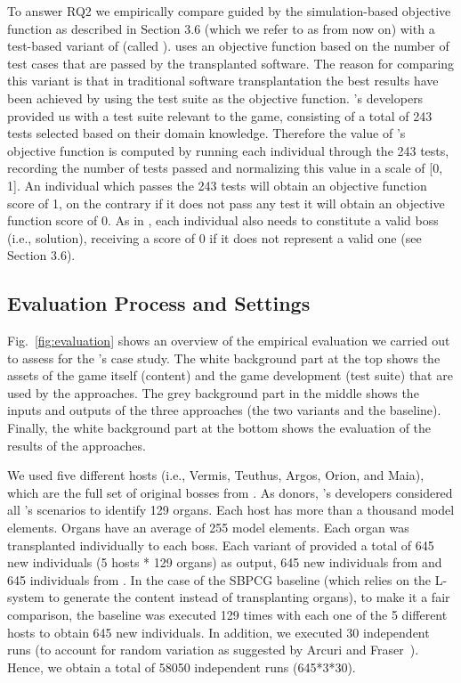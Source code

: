 To answer RQ2 we empirically compare \ApproachName guided by the simulation-based objective function as described in Section 3.6 (which we refer to as \simhotep{} from now on) with  a test-based variant of \ApproachName{} (called \timhotep{}). \timhotep{} uses an objective function based on the number of test cases that are passed by the transplanted software. 
The reason for comparing this variant is that in traditional software transplantation the best results have been achieved by using the test suite as the objective function. 
\CaseStudy{}'s developers provided us with a test suite relevant to the game, consisting of a total of 243 tests selected based on their domain knowledge. 
Therefore the value of \timhotep{}'s objective function is computed by running each individual through the 243 tests, recording the number of tests passed and normalizing this value in a scale of [0, 1]. An individual which passes the 243 tests will obtain an objective function score of 1, on the contrary if it does not pass any test it will obtain an objective function score of 0.  
As in \simhotep{},  each individual also needs to constitute a valid boss (i.e., solution), receiving a score of 0 if it does not represent a valid one (see Section 3.6).

\subsection{Evaluation Process and Settings}
Fig.~\ref{fig:evaluation} shows an overview of the empirical evaluation we carried out to assess \ApproachName for the \CaseStudy's case study. The white background part at the top shows the assets of the game itself (content) and the game development (test suite) that are used by the approaches. The grey background part in the middle shows the inputs and outputs of the three approaches (the two \ApproachName{} variants and the baseline). Finally, the white background part at the bottom shows the evaluation of the results of the approaches.

We used five different hosts (i.e., Vermis, Teuthus, Argos, Orion, and Maia), which are the full set of original bosses from \CaseStudy{}. As donors, \CaseStudy{}'s developers considered all \CaseStudy{}'s scenarios to identify 129 organs. Each host has more than a thousand model elements. Organs have an average of 255 model elements. Each organ was transplanted individually to each boss. Each variant of \ApproachName{} provided a total of 645 new individuals (5 hosts * 129 organs) as output, 645 new individuals from \simhotep{} and 645 individuals from \timhotep{}. In the case of the SBPCG baseline (which relies on the L-system to generate the content instead of transplanting organs), to make it a fair comparison, the baseline was executed 129 times with each one of the 5 different hosts to obtain 645 new individuals. In addition, we executed 30 independent runs (to account for random variation as suggested by Arcuri and Fraser~\cite{arcuri2013parameter}). Hence, we obtain a total of 58050 independent runs (645*3*30).

